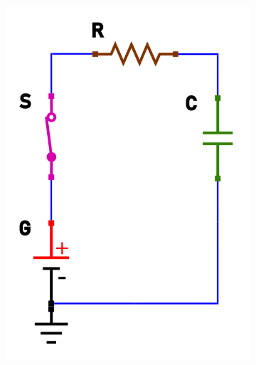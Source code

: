 \documentclass[12pt]{article}
\begin{document}
\begin{figure}[h!]
\begin{subfigure}[b]{0.3\linewidth}
    \includegraphics[width=\linewidth]{data/carica-closed.png}
  \end{subfigure}
  \begin{subfigure}[b]{0.347\linewidth}

\end{subfigure}
\end{figure}
\end{document}
